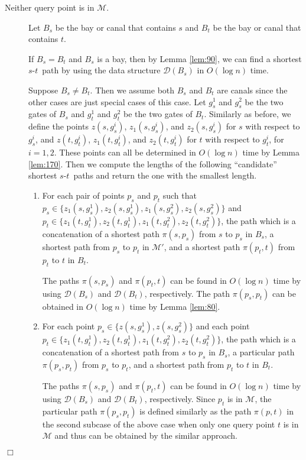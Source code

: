 \documentclass[english,runningheads,11pt]{llncs}
\def\calM{\mathcal{M}}
\def\calD{\mathcal{D}}
\def\st{$s$-$t$}
\newenvironment{proof}{\noindent {\textbf{Proof:}}\rm}{\hfill $\Box$\rm}
\begin{document}
\begin{proof}
\begin{description}
\item[Neither query point is in $\calM$.] Let $B_s$ be the
bay or canal that contains $s$ and $B_t$ be the bay or canal that contains $t$.

If $B_s=B_t$ and $B_s$ is a bay, then by Lemma \ref{lem:90}, we can find a shortest \st\ path
by using the data structure $\calD(B_s)$ in $O(\log n)$ time.

Suppose $B_s\neq B_t$. Then we assume both $B_s$ and $B_t$ are canals since
the other cases are just special cases of this case. Let $g^1_s$ and $g^2_s$ be
the two gates of $B_s$ and $g^1_t$ and $g^2_t$ be
the two gates of $B_t$. Similarly as before, we define the points $z(s,g_s^i)$,
$z_1(s,g_s^i)$, and $z_2(s,g_s^i)$ for $s$ with respect to $g_s^i$,
and $z(t,g_t^i)$, $z_1(t,g_t^i)$, and $z_2(t,g_t^i)$ for $t$ with respect to $g_t^i$, for
$i=1,2$. These points
can all be determined in $O(\log n)$ time by Lemma \ref{lem:170}. Then we
compute the lengths of the following ``candidate'' shortest \st\ paths and
return the one with the smallest length.

\begin{enumerate}
\item
For each pair of points $p_s$ and $p_t$ such that $p_s\in \{z_1(s,g_s^1),z_2(s,g_s^1),z_1(s,g_s^2),z_2(s,g_s^2)\}$ and $p_t\in \{z_1(t,g_t^1),z_2(t,g_t^1),z_1(t,g_t^2),z_2(t,g_t^2)\}$,
the path which is a concatenation of a shortest path $\pi(s,p_s)$ from $s$ to $p_s$
in $B_s$, a shortest path from $p_s$ to $p_t$ in $\calM'$, and a shortest path $\pi(p_t,t)$ from $p_t$ to $t$ in $B_t$.

The paths $\pi(s,p_s)$ and $\pi(p_t,t)$ can be found in
$O(\log n)$ time by using $\calD(B_s)$ and $\calD(B_t)$, respectively.
The path $\pi(p_s,p_t)$ can be obtained in
$O(\log n)$ time by Lemma \ref{lem:80}.

\item
For each point $p_s\in \{z(s,g_s^1),z(s,g_s^2)\}$ and each point $p_t\in
\{z_1(t,g_t^1),z_2(t,g_t^1),z_1(t,g_t^2),z_2(t,g_t^2)\}$, the path
which is a concatenation of a shortest path from $s$ to $p_s$ in $B_s$,
a particular path $\pi(p_s,p_t)$ from $p_s$ to $p_t$, and a shortest
path from $p_t$ to $t$ in $B_t$.

The paths $\pi(s,p_s)$ and $\pi(p_t,t)$ can be found in
$O(\log n)$ time by using $\calD(B_s)$ and $\calD(B_t)$, respectively.
Since $p_t$ is in $\calM$,
the particular path $\pi(p_s,p_t)$ is defined similarly as
the path $\pi(p,t)$ in the second subcase of
the above case when only one query point $t$ is in $\calM$
and thus can be obtained by the similar approach.


\end{enumerate}
\end{description}
\end{proof}
\end{document}
